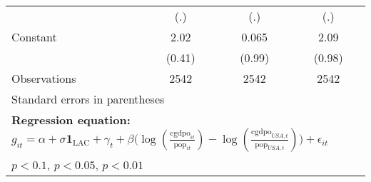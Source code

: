 \begin{sidewaystable}[htbp]
\begin{tabular}{l*{3}{c}}
                &      (.)         &      (.)         &      (.)         \\
\addlinespace
Constant        &     2.02\sym{***}&    0.065         &     2.09\sym{**} \\
                &   (0.41)         &   (0.99)         &   (0.98)         \\
\midrule
Observations    &     2542         &     2542         &     2542         \\
\bottomrule
\multicolumn{4}{l}{\footnotesize Standard errors in parentheses}\\
\multicolumn{4}{l}{\footnotesize \textbf{Regression equation:} \(g_{it} = \alpha + \sigma \mathbf{1}_{\textrm{LAC}} + \gamma_t + \beta \big(\log (\frac{\textrm{cgdpo}_{it}}{\textrm{pop}_{it}} ) - \log (\frac{\textrm{cgdpo}_{USA,t}}{\textrm{pop}_{USA,t}}  ) \big) + \epsilon_{it}\)}\\
\multicolumn{4}{l}{\footnotesize \sym{*} \(p<0.1\), \sym{**} \(p<0.05\), \sym{***} \(p<0.01\)}\\
\end{tabular}
\end{sidewaystable}
